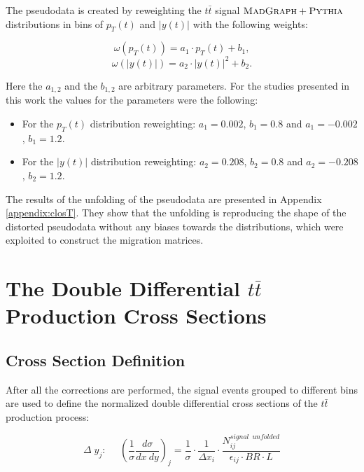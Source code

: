 The pseudodata is created by reweighting the $t\bar{t}$ signal $\textsc{MadGraph}+\textsc{Pythia}$ distributions in bins of $p_{T}(t)$ and $|y(t)|$ with the following
weights:

\begin{equation}
 \omega(p_{T}(t)) = a_{1} \cdot p_{T}(t) + b_{1},
\end{equation}
\begin{equation}
 \omega(|y(t)|) = a_{2} \cdot |y(t)|^{2} + b_{2}.
\end{equation}

Here the $a_{1,2}$ and the $b_{1,2}$ are arbitrary parameters. For the studies presented in this work the values for the parameters were the 
following: 
\begin{itemize}
 \item For the $p_{T}(t)$ distribution reweighting: $a_{1} = 0.002$, $b_{1} = 0.8$ and $a_{1} = -0.002$, $b_{1} = 1.2$. 
 \item For the $|y(t)|$ distribution reweighting: $a_{2} = 0.208$, $b_{2} = 0.8$ and $a_{2} = -0.208$, $b_{2} = 1.2$.
\end{itemize}

The results of the unfolding of the pseudodata are presented in Appendix \ref{appendix:closT}. They show that the unfolding is reproducing
the shape of the distorted pseudodata without any biases towards the distributions, which were exploited to construct the migration matrices.

\section{The Double Differential $t\bar{t}$ Production Cross Sections}

\subsection{Cross Section Definition}\label{ssec:xsec_def}

After all the corrections are performed, the signal events grouped to different bins are used to define the normalized double differential cross sections
of the $t\bar{t}$ production process:

\begin{equation}\label{eq:ddxsecdef}
 \Delta\;y_{j}: \:\:\:\:\:\:(\frac{1}{\sigma} \frac{d\sigma}{dx\:dy})_{j} = \frac{1}{\sigma} \cdot \frac{1}{\Delta x_{i}} \cdot \frac{N^{signal\:\;unfolded}_{ij}}{\epsilon_{ij} \cdot BR \cdot L}
\end{equation}

